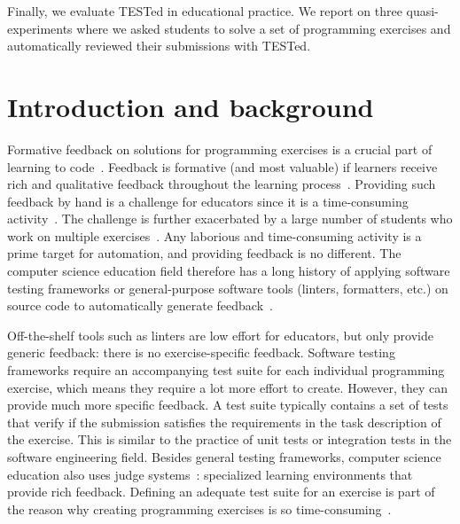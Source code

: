 \documentclass[../main]{subfiles}
\begin{document}
Finally, we evaluate TESTed in educational practice.
We report on three quasi-experiments where we asked students to solve a set of programming exercises and automatically reviewed their submissions with TESTed.

\section{Introduction and background}\label{sec:tested1-introduction-and-background}

Formative feedback on solutions for programming exercises is a crucial part of learning to code~\autocite{shuteFocusFormativeFeedback2008,orrellFeedbackLearningAchievement2006,luxton-reillyIntroductoryProgrammingSystematic2018}.
Feedback is formative (and most valuable) if learners receive rich and qualitative feedback throughout the learning process~\autocite{blackDevelopingTheoryFormative2009}.
Providing such feedback by hand is a challenge for educators since it is a time-consuming activity~\autocite{camposMultinationalCaseStudy2012,cheangAutomatedGradingProgramming2003, keuningSystematicLiteratureReview2018,haoUnderstandingEffectiveDesign2021,zavalaUseSemanticbasedAIG2018,staubitzRepositoryOpenAutogradable2017,pirttinenCrowdsourcingProgrammingAssignments2018,gulwaniFeedbackGenerationPerformance2014,tangDatadrivenTestCase2016,edwardsDevelopingCommonFormat2008a}.
The challenge is further exacerbated by a large number of students who work on multiple exercises~\autocite{campGenerationCSGrowth2017,saxExaminingEnrollmentGrowth2017}.
Any laborious and time-consuming activity is a prime target for automation, and providing feedback is no different.
The computer science education field therefore has a long history of applying software testing frameworks or general-purpose software tools (linters, formatters, etc.) on source code to automatically generate feedback~\autocite{haoUnderstandingEffectiveDesign2021,edwardsUsingSoftwareTesting2004,paivaAutomatedAssessmentComputer2022,keuningSystematicLiteratureReview2018}.

Off-the-shelf tools such as linters are low effort for educators, but only provide generic feedback: there is no exercise-specific feedback.
Software testing frameworks require an accompanying test suite for each individual programming exercise, which means they require a lot more effort to create.
However, they can provide much more specific feedback.
A test suite typically contains a set of tests that verify if the submission satisfies the requirements in the task description of the exercise.
This is similar to the practice of unit tests or integration tests in the software engineering field.
Besides general testing frameworks, computer science education also uses judge systems~\autocite{paivaAutomatedAssessmentComputer2022,wasikSurveyOnlineJudge2018}: specialized learning environments that provide rich feedback.
Defining an adequate test suite for an exercise is part of the reason why creating programming exercises is so time-consuming~\autocite{zavalaUseSemanticbasedAIG2018,staubitzRepositoryOpenAutogradable2017,queirosPexilProgrammingExercises2011,pirttinenCrowdsourcingProgrammingAssignments2018,gulwaniFeedbackGenerationPerformance2014,tangDatadrivenTestCase2016}.
\end{document}
